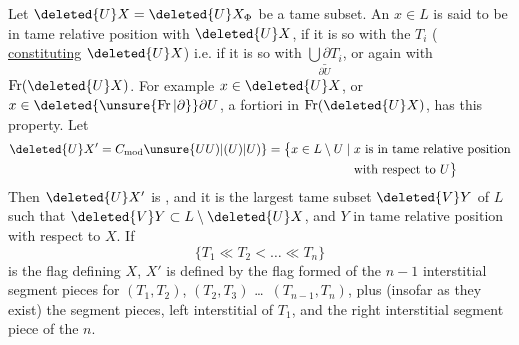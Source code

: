 
 Let $\deleted{U}X=\deleted{U}X_{\Phi}$ be a tame subset. An $x\in L$ is said to be in tame relative position with $\deleted{U}X$, if it is so with the $T_i$ ( \uline{constituting} $\deleted{U}X$) i.e. if it is so with $\underset{\partial U}{\underline{\bigcup\partial T_i}}$, or again with $\operatorname{Fr}(\deleted{U}X)$.
For example  $x\in\deleted{U}X$, or $x\in\deleted{\unsure{\operatorname{Fr}|\partial}}\partial U$, a fortiori in $\operatorname{Fr}(\deleted{U}X)$, has this property. Let
\[
\begin{aligned}
\deleted{U}X'=C_{\mathrm{mod}}\unsure{U U)|(U)|U)}=\bigl\{x\in L\setminus U\mid{}&x\text{ is in tame relative position}\\
&\text{with respect to }U\bigr\}
\end{aligned}
\]
Then  $\deleted{U}X'$ is , and it is the largest tame subset $\deleted{V}Y$ of $L$ such that $\deleted{V}Y\subset L\setminus\deleted{U}X$, and $Y$ in tame relative position with respect to $X$. If
\[
\{T_1\ll T_2<\ldots\ll T_n\}
\]
is the flag defining  $X$, $X'$ is defined by the flag formed of the $n-1$ interstitial segment pieces  for $(T_1,T_2)$, $(T_2,T_3)$ \ldots\ $(T_{n-1},T_n)$, plus (insofar as they exist) the segment pieces, left interstitial of $T_1$, and the right interstitial segment piece of the $n$. 
